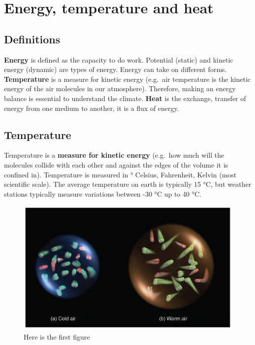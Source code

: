 \documentclass[oneside]{book}
\begin{document}
\section{Energy, temperature and
heat}\label{energy-temperature-and-heat}

\subsection{Definitions}\label{definitions}

\textbf{Energy} is defined as the capacity to do work. Potential
(static) and kinetic energy (dynamic) are types of energy. Energy can
take on different forms. \textbf{Temperature} is a measure for kinetic
energy (e.g.~air temperature is the kinetic energy of the air molecules
in our atmosphere). Therefore, making an energy balance is essential to
understand the climate. \textbf{Heat} is the exchange, transfer of
energy from one medium to another, it is a flux of energy.

\subsection{Temperature}\label{temperature}

Temperature is a \textbf{measure for kinetic energy} (e.g.~how much will
the molecules collide with each other and against the edges of the
volume it is confined in). Temperature is measured in ° Celsius,
Fahrenheit, Kelvin (most scientific scale). The average temperature on
earth is typically 15 °C, but weather stations typically measure
variations between -30 °C up to 40 °C.

\begin{figure}

{\centering \includegraphics[width=0.5\linewidth]{figures/Figure114} 

}

\caption{Here is the first figure}\label{fig:Temperature}
\end{figure}
\end{document}
